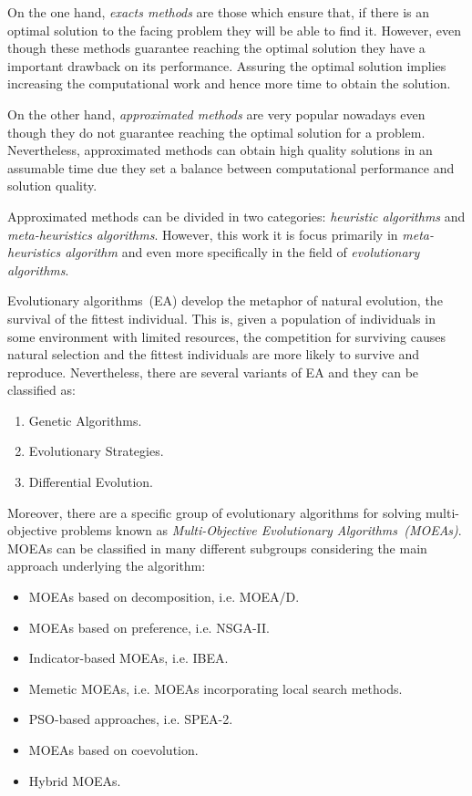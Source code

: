 On the one hand, \textit{exacts methods} are those which ensure that, if there is an optimal solution to the facing problem they will be able to find it. However, even though these methods guarantee reaching the optimal solution they have a important drawback on its performance. Assuring the optimal solution implies increasing the computational work and hence more time to obtain the solution.

On the other hand, \textit{approximated methods} are very popular nowadays even though they do not guarantee reaching the optimal solution for a problem. Nevertheless, approximated methods can obtain high quality solutions in an assumable time due they set a balance between computational performance and solution quality. 

Approximated methods can be divided in two categories: \textit{heuristic algorithms} and \textit{meta-heuristics algorithms}. However, this work it is focus primarily in \textit{meta-heuristics algorithm} and even more specifically in the field of \textit{evolutionary algorithms}.

Evolutionary algorithms~(EA) develop the metaphor of natural evolution, the survival of the fittest individual\cite{eiben}. This is, given a population of individuals in some environment with limited resources, the competition for surviving causes natural selection and the fittest individuals are more likely to survive and reproduce. Nevertheless, there are several variants of EA and they can be classified as:
\begin{enumerate}
    \item Genetic Algorithms\cite{Whitley1994, Algorithms2004, Sivanandam2008}.
    \item Evolutionary Strategies\cite{Beyer2002, Hansen2017}.
    \item Differential Evolution\cite{Algorithm2006, DE1, DE2, DE3}.
\end{enumerate}

Moreover, there are a specific group of evolutionary algorithms for solving multi-objective problems known as \textit{Multi-Objective Evolutionary Algorithms~(MOEAs)}. MOEAs can be classified in many different subgroups considering the main approach underlying the algorithm\cite{ZHOU201132}:
\begin{itemize}
    \item MOEAs based on decomposition, i.e. MOEA/D\cite{Zhang2007, Ma2018}.
    \item MOEAs based on preference, i.e. NSGA-II\cite{996017}.
    \item Indicator-based MOEAs, i.e. IBEA\cite{IBEA}.
    \item Memetic MOEAs, i.e. MOEAs incorporating local search methods.
    \item PSO-based approaches, i.e. SPEA-2\cite{Laumanns2001SPEA2}.
    \item MOEAs based on coevolution.
    \item Hybrid MOEAs.
\end{itemize}

